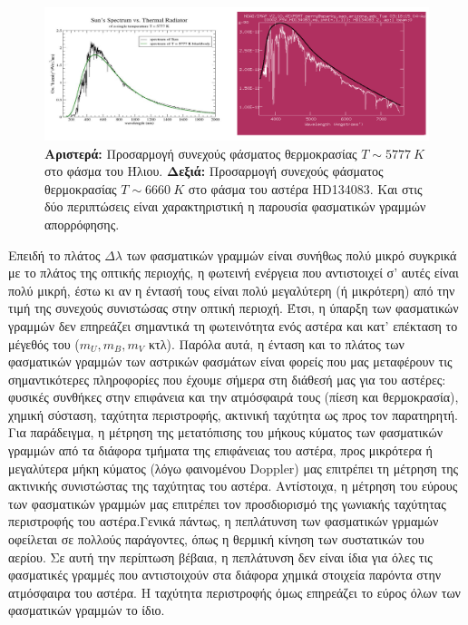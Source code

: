 \begin{figure}[h]
    \centering
    \includegraphics[width=\linewidth]{Figures/contin_spectra.png}
    \caption{\textbf{Αριστερά:} Προσαρμογή συνεχούς φάσματος θερμοκρασίας $ T \sim 5777 \ K$ στο φάσμα του Ήλιου. \textbf{Δεξιά:} Προσαρμογή συνεχούς φάσματος θερμοκρασίας $ T \sim 6660 \ K$ στο φάσμα του αστέρα HD134083. Και στις δύο περιπτώσεις είναι χαρακτηριστική η παρουσία φασματικών γραμμών απορρόφησης.}
    \label{fig:continuous_spectra}
\end{figure}

Επειδή το πλάτος $\Delta \lambda$ των φασματικών γραμμών είναι συνήθως πολύ μικρό συγκρικά με το πλάτος της οπτικής περιοχής, η φωτεινή ενέργεια που αντιστοιχεί σ' αυτές είναι πολύ μικρή, έστω κι αν η έντασή τους είναι πολύ μεγαλύτερη (ή μικρότερη) από την τιμή της συνεχούς συνιστώσας στην οπτική περιοχή. Έτσι, η ύπαρξη των φασματικών γραμμών δεν επηρεάζει σημαντικά τη φωτεινότητα ενός αστέρα και κατ' επέκταση το μέγεθός του ($m_U, m_B, m_V$ κτλ). Παρόλα αυτά, η ένταση και το πλάτος των φασματικών γραμμών των αστρικών φασμάτων είναι φορείς που μας μεταφέρουν τις σημαντικότερες πληροφορίες που έχουμε σήμερα στη διάθεσή μας για του αστέρες: φυσικές συνθήκες στην επιφάνεια και την ατμόσφαιρά τους (πίεση και θερμοκρασία), χημική σύσταση, ταχύτητα περιστροφής, ακτινική ταχύτητα ως προς τον παρατηρητή. Για παράδειγμα, η μέτρηση της μετατόπισης του μήκους κύματος των φασματικών γραμμών από τα διάφορα τμήματα της επιφάνειας του αστέρα, προς μικρότερα ή μεγαλύτερα μήκη κύματος (λόγω φαινομένου Doppler) μας επιτρέπει τη μέτρηση της ακτινικής συνιστώστας της ταχύτητας του αστέρα. Αντίστοιχα, η μέτρηση του εύρους των φασματικών γραμμών μας επιτρέπει τον προσδιορισμό της γωνιακής ταχύτητας περιστροφής του αστέρα.Γενικά πάντως, η πεπλάτυνση των φασματικών γρμαμών οφείλεται σε πολλούς παράγοντες, όπως η θερμική κίνηση των συστατικών του αερίου. Σε αυτή την περίπτωση βέβαια, η πεπλάτυνση δεν είναι ίδια για όλες τις φασματικές γραμμές που αντιστοιχούν στα διάφορα χημικά στοιχεία παρόντα στην ατμόσφαιρα του αστέρα. Η ταχύτητα περιστροφής όμως επηρεάζει το εύρος όλων των φασματικών γραμμών το ίδιο.

